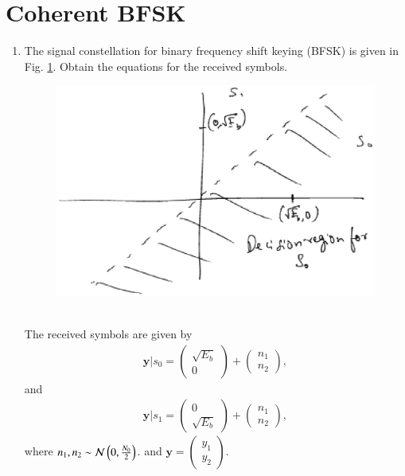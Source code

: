 \documentclass[journal,12pt,twocolumn]{IEEEtran}
\renewcommand\thesection{\arabic{section}}
\begin{document}
\section{Coherent BFSK}
\begin{enumerate}[label=\thesection.\arabic*.,ref=\thesection.\theenumi]

\item
The signal constellation for binary frequency shift keying (BFSK) is given in Fig. \ref{fig:ee18btech11042_bfsk_const}.
Obtain the equations for the received symbols.
\begin{figure}[!ht]
\centering
\includegraphics[width=\columnwidth]{./figs/bfsk_const.eps}
\caption{}
\label{fig:ee18btech11042_bfsk_const}
\end{figure}
\\
\solution
The received symbols are given by
\begin{align}
\mathbf{y}|s_0 = 
\begin{pmatrix*}
\sqrt{E_b} \\
0
\end{pmatrix*}
+
\begin{pmatrix*}
 n_{1}\\
n_{2}
\end{pmatrix*},
\end{align}
and 
\begin{align}
\mathbf{y}|s_1 = 
\begin{pmatrix*}
0\\
\sqrt{E_b} 
\end{pmatrix*}
+
\begin{pmatrix*}
n_{1}\\
 n_{2}
\end{pmatrix*},
\end{align}
where $n_1,n_2 \sim \mathcal{N}\left(0,\frac{N_0}{2}\right)$. and
$
\mathbf{y} = 
\begin{pmatrix*}
y_{1}\\
 y_{2}
\end{pmatrix*}
$.


\end{enumerate}
\end{document}
